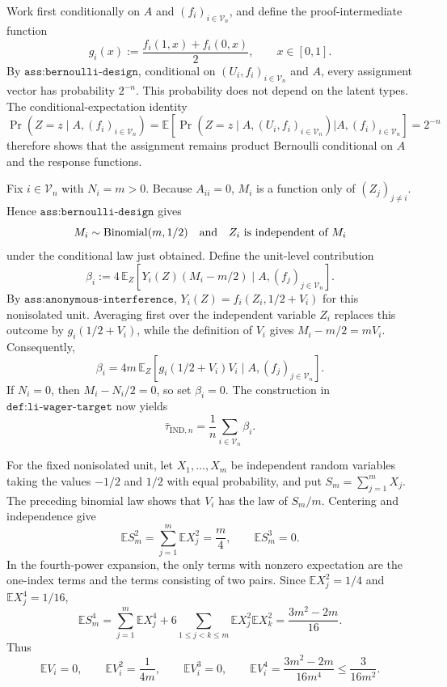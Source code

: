 Work first conditionally on \(A\) and \((f_i)_{i\in\mathcal V_n}\), and define the proof-intermediate function
\[
 g_i(x):=\frac{f_i(1,x)+f_i(0,x)}{2},\qquad x\in[0,1].
\]
By \(\texttt{ass:bernoulli-design}\), conditional on \((U_i,f_i)_{i\in\mathcal V_n}\) and \(A\), every assignment vector has probability \(2^{-n}\). This probability does not depend on the latent types. The conditional-expectation identity
\[
 \Pr\!\left(Z=z\mid A,(f_i)_{i\in\mathcal V_n}\right)
 =\mathbb E\!\left[
 \Pr\!\left(Z=z\mid A,(U_i,f_i)_{i\in\mathcal V_n}\right)
 \mathrel{\big|}A,(f_i)_{i\in\mathcal V_n}
 \right]
 =2^{-n}
\]
therefore shows that the assignment remains product Bernoulli conditional on \(A\) and the response functions.

Fix \(i\in\mathcal V_n\) with \(N_i=m>0\). Because \(A_{ii}=0\), \(M_i\) is a function only of \((Z_j)_{j\ne i}\). Hence \(\texttt{ass:bernoulli-design}\) gives
\[
 M_i\sim {\rm Binomial}(m,1/2)
 \quad\text{and}\quad
 Z_i\ \text{is independent of}\ M_i
\]
under the conditional law just obtained. Define the unit-level contribution
\[
 \beta_i:=4\,\mathbb E_Z\!\left[
 Y_i(Z)(M_i-m/2)\mid A,(f_j)_{j\in\mathcal V_n}
 \right].
\]
By \(\texttt{ass:anonymous-interference}\), \(Y_i(Z)=f_i(Z_i,1/2+V_i)\) for this nonisolated unit. Averaging first over the independent variable \(Z_i\) replaces this outcome by \(g_i(1/2+V_i)\), while the definition of \(V_i\) gives \(M_i-m/2=mV_i\). Consequently,
\[
 \beta_i
 =4m\,\mathbb E_Z\!\left[
 g_i(1/2+V_i)V_i\mid A,(f_j)_{j\in\mathcal V_n}
 \right].
\]
If \(N_i=0\), then \(M_i-N_i/2=0\), so set \(\beta_i=0\). The construction in \(\texttt{def:li-wager-target}\) now yields
\[
 \bar\tau_{\mathrm{IND},n}=\frac1n\sum_{i\in\mathcal V_n}\beta_i.
\]

For the fixed nonisolated unit, let \(X_1,\ldots,X_m\) be independent random variables taking the values \(-1/2\) and \(1/2\) with equal probability, and put \(S_m=\sum_{j=1}^mX_j\). The preceding binomial law shows that \(V_i\) has the law of \(S_m/m\). Centering and independence give
\[
 \mathbb E S_m^2=\sum_{j=1}^m\mathbb E X_j^2=\frac m4,
 \qquad
 \mathbb E S_m^3=0.
\]
In the fourth-power expansion, the only terms with nonzero expectation are the one-index terms and the terms consisting of two pairs. Since \(\mathbb E X_j^2=1/4\) and \(\mathbb E X_j^4=1/16\),
\[
 \mathbb E S_m^4
 =\sum_{j=1}^m\mathbb E X_j^4
 +6\sum_{1\le j<k\le m}\mathbb E X_j^2\mathbb E X_k^2
 =\frac{3m^2-2m}{16}.
\]
Thus
\[
 \mathbb E V_i=0,
 \qquad
 \mathbb E V_i^2=\frac1{4m},
 \qquad
 \mathbb E V_i^3=0,
 \qquad
 \mathbb E V_i^4=\frac{3m^2-2m}{16m^4}\le\frac3{16m^2}.
\]

